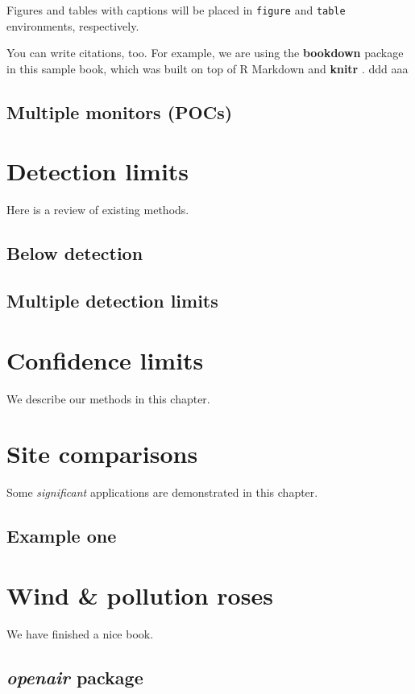 \documentclass[14pt,]{book}
\theoremstyle{definition}
\theoremstyle{definition}
\theoremstyle{remark}
\begin{document}
Figures and tables with captions will be placed in \texttt{figure} and
\texttt{table} environments, respectively.

You can write citations, too. For example, we are using the
\textbf{bookdown} package \citep{R-bookdown} in this sample book, which
was built on top of R Markdown and \textbf{knitr} \citep{xie2015}. ddd
aaa

\section{Multiple monitors (POCs)}\label{multiple-monitors-pocs}

\chapter{Detection limits}\label{detection-limits}

Here is a review of existing methods.

\section{Below detection}\label{below-detection}

\section{Multiple detection limits}\label{multiple-detection-limits}

\chapter{Confidence limits}\label{confidence-limits}

We describe our methods in this chapter.

\chapter{Site comparisons}\label{site-comparisons}

Some \emph{significant} applications are demonstrated in this chapter.

\section{Example one}\label{example-one}

\chapter{Wind \& pollution roses}\label{wind-pollution-roses}

We have finished a nice book.

\section{\texorpdfstring{\emph{openair}
package}{openair package}}\label{openair-package}


\end{document}

